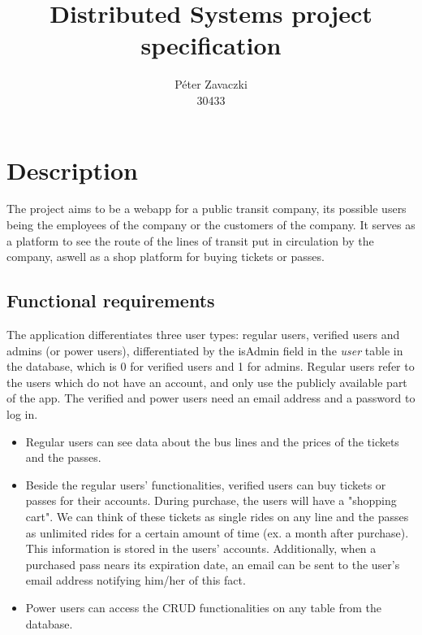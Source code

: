 \documentclass[a4paper,12pt]{report}
\title{Distributed Systems project specification}
\author{Péter Zavaczki\\30433}
\begin{document}
\maketitle

\chapter{Description}
The project aims to be a webapp for a public transit company, its possible users being the employees of the company or the customers of the company.
It serves as a platform to see the route of the lines of transit put in circulation by the company, aswell as a shop platform for buying tickets or passes.

\section{Functional requirements}
The application differentiates three user types: regular users, verified users and admins (or power users), differentiated by the isAdmin field in the \textit{user} table in the database, which is 0 for verified users and 1 for admins.
Regular users refer to the users which do not have an account, and only use the publicly available part of the app.
The verified and power users need an email address and a password to log in.

\begin{itemize}
    \item Regular users can see data about the bus lines and the prices of the tickets and the passes.
    \item Beside the regular users' functionalities, verified users can buy tickets or passes for their accounts.
    During purchase, the users will have a "shopping cart".
    We can think of these tickets as single rides on any line and the passes as unlimited rides for a certain amount of time (ex. a month after purchase).
    This information is stored in the users' accounts.
    Additionally, when a purchased pass nears its expiration date, an email can be sent to the user's email address notifying him/her of this fact.
    \item Power users can access the CRUD functionalities on any table from the database.
\end{itemize}
\end{document}
